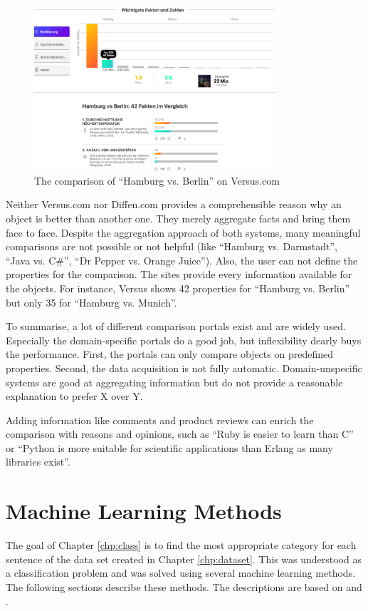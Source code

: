 \begin{figure}[htp]
    \centering
	\includegraphics[width=0.8\textwidth]{images/ds-sys/versus}
	\caption{The comparison of \enquote{Hamburg vs. Berlin} on Versus.com}
		\label{img:versus}
\end{figure}

Neither Versus.com nor Diffen.com provides a comprehensible reason why an object is better than another one. They merely aggregate facts and bring them face to face. Despite the aggregation approach of both systems, many meaningful comparisons are not possible or not helpful (like \enquote{Hamburg vs. Darmstadt}, \enquote{Java vs. C\#}, \enquote{Dr Pepper vs. Orange Juice}).
Also, the user can not define the properties for the comparison. The sites provide every information available for the objects. For instance, Versus shows 42 properties for \enquote{Hamburg vs. Berlin} but only 35 for \enquote{Hamburg vs. Munich}.
\newline

To summarise, a lot of different comparison portals exist and are widely used. Especially the domain-specific portals do a good job, but inflexibility dearly buys the performance. First, the portals can only compare objects on predefined properties. Second, the data acquisition is not fully automatic. Domain-unspecific systems are good at aggregating information but do not provide a reasonable explanation to prefer X over Y.

Adding information like comments and product reviews can enrich the comparison with reasons and opinions, such as \enquote{Ruby is easier to learn than C} or \enquote{Python is more suitable for scientific applications than Erlang as many libraries exist}.

\FloatBarrier

\section{Machine Learning Methods}
The goal of Chapter \ref{chp:class} is to find the most appropriate category for each sentence of the data set created in Chapter \ref{chp:dataset}. This was understood as a classification problem and was solved using several machine learning methods. The following sections describe these methods. The descriptions are based on \cite{mitchell1997machine} and \cite{friedman2001elements}. 

